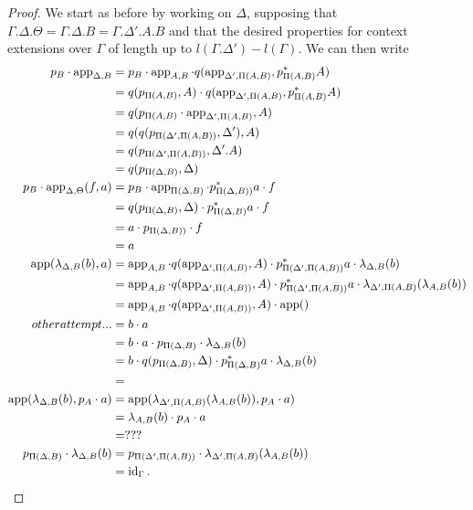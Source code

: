 \begin{proof}
  We start as before by working on $\Delta$, supposing that
  $\Gamma.\Delta.\Theta=\Gamma.\Delta.B=\Gamma.\Delta'.A.B$ and that
  the desired properties for context extensions over $\Gamma$ of length
  up to $l(\Gamma.\Delta')-l(\Gamma)$.
  We can then write
  \begin{align*}
    p_B\cdot\operatorname{app}_{\Delta,B}
    &=p_B\cdot
    \operatorname{app}_{A,B}\cdot
    q(\operatorname{app}_{\Delta',\Pi(A,B)},p^*_{\Pi(A,B)}A) \\
    &=q(p_{\Pi(A,B)},A)\cdot
    q(\operatorname{app}_{\Delta',\Pi(A,B)},p^*_{\Pi(A,B)}A) \\
    &=q(p_{\Pi(A,B)}\cdot\operatorname{app}_{\Delta',\Pi(A,B)},A) \\
    &=q(q(p_{\Pi(\Delta',\Pi(A,B))},\Delta'),A) \\
    &=q(p_{\Pi(\Delta',\Pi(A,B))},\Delta'.A) \\
    &=q(p_{\Pi(\Delta,B)},\Delta) \\
    p_B\cdot\operatorname{app}_{\Delta,\Theta}(f,a)
    &=p_B\cdot
    \operatorname{app}_{\Pi(\Delta,B)}\cdot
    p^*_{\Pi(\Delta,B))}a\cdot
    f \\
    &=q(p_{\Pi(\Delta,B)},\Delta)\cdot
    p^*_{\Pi(\Delta,B)}a\cdot
    f \\
    &=a\cdot
    p_{\Pi(\Delta,B))}\cdot
    f \\
    &=a \\
    \operatorname{app}(\lambda_{\Delta,B}(b),a)
    &=\operatorname{app}_{A,B}\cdot
    q(\operatorname{app}_{\Delta',\Pi(A,B)},A)\cdot
    p^*_{\Pi(\Delta',\Pi(A,B))}a\cdot
    \lambda_{\Delta,B}(b) \\
    &=\operatorname{app}_{A,B}\cdot
    q(\operatorname{app}_{\Delta',\Pi(A,B))},A)\cdot
    p^*_{\Pi(\Delta',\Pi(A,B))}a\cdot
    \lambda_{\Delta',\Pi(A,B)}(\lambda_{A,B}(b)) \\
    &=\operatorname{app}_{A,B}\cdot
    q(\operatorname{app}_{\Delta',\Pi(A,B))},A)\cdot
    \operatorname{app}() \\
    other attempt...
    &=b\cdot a \\
    &=b\cdot
    a\cdot
    p_{\Pi(\Delta,B)}\cdot
    \lambda_{\Delta,B}(b) \\
    &=b\cdot
    q(p_{\Pi(\Delta,B)},\Delta)\cdot
    p^*_{\Pi(\Delta,B)}a\cdot
    \lambda_{\Delta,B}(b) \\
    &= \\
    \operatorname{app}(\lambda_{\Delta,B}(b),p_A\cdot a)
    &=\operatorname{app}(\lambda_{\Delta',\Pi(A,B)}(\lambda_{A,B}(b)),p_A\cdot a) \\
    &=\lambda_{A,B}(b)\cdot p_A\cdot a \\
    &= ??? \\
    p_{\Pi(\Delta,B)}\cdot\lambda_{\Delta,B}(b)
    &=p_{\Pi(\Delta',\Pi(A,B))}\cdot
    \lambda_{\Delta',\Pi(A,B)}(\lambda_{A,B}(b)) \\
    &=\operatorname{id}_\Gamma.
  \end{align*}


\end{proof}
